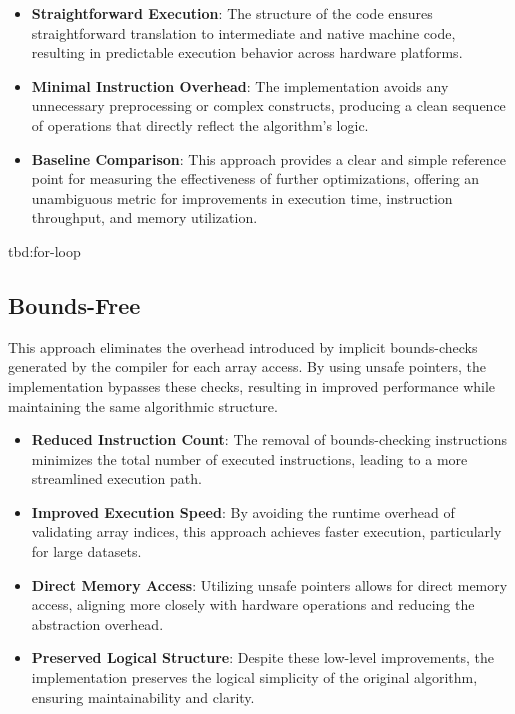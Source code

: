 \documentclass{article}
\begin{document}
\begin{itemize}
  \item \textbf{Straightforward Execution}: The structure of the code ensures straightforward translation to intermediate and native machine code, resulting in predictable execution behavior across hardware platforms.
  \item \textbf{Minimal Instruction Overhead}: The implementation avoids any unnecessary preprocessing or complex constructs, producing a clean sequence of operations that directly reflect the algorithm's logic.
  \item \textbf{Baseline Comparison}: This approach provides a clear and simple reference point for measuring the effectiveness of further optimizations, offering an unambiguous metric for improvements in execution time, instruction throughput, and memory utilization.
\end{itemize}

tbd:for-loop

\subsection{Bounds-Free}

This approach eliminates the overhead introduced by implicit bounds-checks generated by the compiler for each array access. By using unsafe pointers, the implementation bypasses these checks, resulting in improved performance while maintaining the same algorithmic structure.

\begin{itemize}
  \item \textbf{Reduced Instruction Count}: The removal of bounds-checking instructions minimizes the total number of executed instructions, leading to a more streamlined execution path.
  \item \textbf{Improved Execution Speed}: By avoiding the runtime overhead of validating array indices, this approach achieves faster execution, particularly for large datasets.
  \item \textbf{Direct Memory Access}: Utilizing unsafe pointers allows for direct memory access, aligning more closely with hardware operations and reducing the abstraction overhead.
  \item \textbf{Preserved Logical Structure}: Despite these low-level improvements, the implementation preserves the logical simplicity of the original algorithm, ensuring maintainability and clarity.
\end{itemize}
\end{document}
